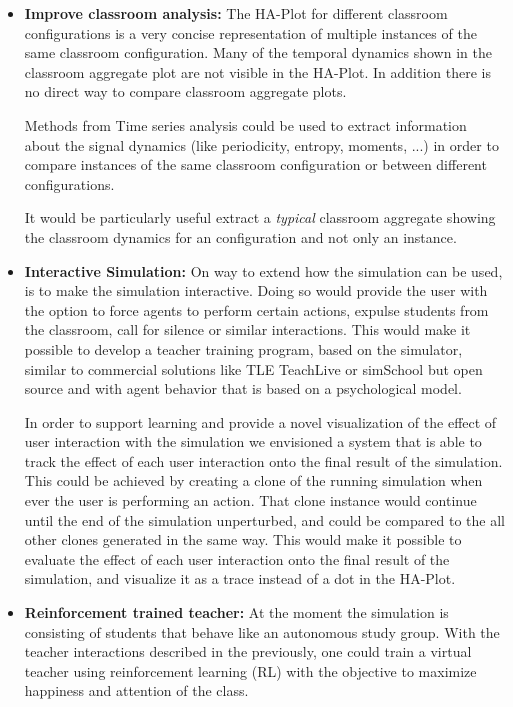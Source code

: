 \begin{itemize}
    \item \textbf{Improve classroom analysis:}
    The HA-Plot for different classroom configurations is a very concise representation
    of multiple instances of the same classroom configuration. Many of the temporal
    dynamics shown in the classroom aggregate plot are not visible in the HA-Plot.
    In addition there is no direct way to compare classroom aggregate plots.

    \bb

    Methods from Time series analysis could be used to extract information about
    the signal dynamics (like periodicity, entropy, moments, ...) in order to compare
    instances of the same classroom configuration or between different configurations.

    \bb

    It would be particularly useful extract a \textit{typical} classroom aggregate
    showing the classroom dynamics for an configuration and not only an instance.
    \item \textbf{Interactive Simulation:} 
    On way to extend how the simulation can be used, is to make the simulation
    interactive. Doing so would provide the user with the option to force agents
    to perform certain actions, expulse students from the classroom, call for silence
    or similar interactions. This would make it possible to develop a teacher training 
    program, based on the simulator, similar to commercial solutions like TLE TeachLive
    \cite{Dieker2017} or simSchool \cite{Badiee2015} but open source and with
    agent behavior that is based on a psychological model.
    
    \bb
    
    In order to support learning and provide a novel visualization of the effect
    of user interaction with the simulation we envisioned a system that is able to track
    the effect of each user interaction onto the final result of the simulation.
    This could be achieved by creating a clone of the running simulation when ever
    the user is performing an action. That clone instance would continue until the 
    end of the simulation unperturbed, and could be compared to the all other clones
    generated in the same way. This would make it possible to evaluate the effect
    of each user interaction onto the final result of the simulation, and visualize it
    as a trace instead of a dot in the HA-Plot.

    \item \textbf{Reinforcement trained teacher:} At the moment the simulation
    is consisting of students that behave like an autonomous study group.
    With the teacher interactions described in the previously, one could train a
    virtual teacher using reinforcement learning (RL) with
    the objective to maximize happiness and attention of the class.
    

\end{itemize}
